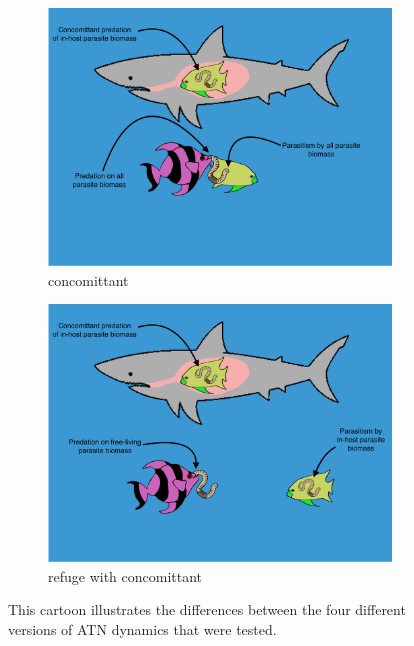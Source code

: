 \documentclass[11pt]{amsart}
\begin{document}
\begin{figure}
\begin{subfigure}{.45\textwidth}
\caption{concomittant\label{subfig:modelsc}}
\includegraphics[width=\textwidth]{figures/Null+Con.png}
\end{subfigure}
\begin{subfigure}{.45\textwidth}
\caption{refuge with concomittant\label{subfig:modelsd}}
\includegraphics[width=\textwidth]{figures/Con+Ref.png}
\end{subfigure}
\caption{This cartoon illustrates the differences between the four different versions of ATN dynamics that were tested.  \label{fig:cartoons}}
\end{figure}
\end{document}
